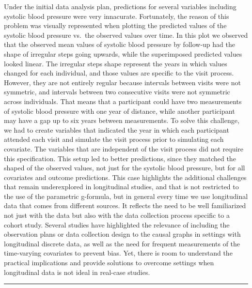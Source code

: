 \documentclass[
]{book}
\begin{document}
Under the initial data analysis plan, predictions for several variables including systolic blood pressure were very innacurate. Fortunately, the reason of this problem was visually represented when plotting the predicted values of the systolic blood pressure vs.~the observed values over time. In this plot we observed that the observed mean values of systolic blood pressure by follow-up had the shape of irregular steps going upwards, while the superimposed predicted values looked linear. The irregular steps shape represent the years in which values changed for each individual, and those values are specific to the visit process. However, they are not entirely regular because intervals between visits were not symmetric, and intervals between two consecutive visits were not symmetric across individuals. That means that a participant could have two measurements of systolic blood pressure with one year of distance, while another participant may have a gap up to six years between measurements.
To solve this challenge, we had to create variables that indicated the year in which each participant attended each visit and simulate the visit process prior to simulating each covariate. The variables that are independent of the visit process did not require this specification. This setup led to better predictions, since they matched the shaped of the observed values, not just for the systolic blood pressure, but for all covariates and outcome predictions. This case highlights the additional challenges that remain underexplored in longitudinal studies, and that is not restricted to the use of the parametric g-formula, but in general every time we use longitudinal data that comes from different sources. It reflects the need to be well familiarized not just with the data but also with the data collection process specific to a cohort study. Several studies have highlighted the relevance of including the observation plans or data collection design to the causal graphs in settings with longitudinal discrete data\autocite{hernan2009,zhang2011}, as well as the need for frequent measurements of the time-varying covariates to prevent bias\autocite{young2019}. Yet, there is room to understand the practical implications and provide solutions to overcome settings when longitudinal data is not ideal in real-case studies.

\begin{center}\rule{0.5\linewidth}{0.5pt}\end{center}
\end{document}
